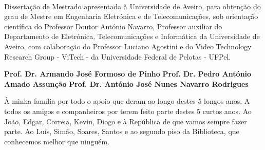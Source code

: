 \TitlePage

  \HEADER{\BAR}
         {\ThesisYear}
  \TITLE{\myName}
        {\TituloTese}
        {\ThesisTitle}
\EndTitlePage
\titlepage\ \endtitlepage %


%
%

\TitlePage
  \HEADER{}{\ThesisYear}
  \TITLE{\myName}
        {\TituloTese}
        {\ThesisTitle}
  \vskip 15mm
  \TEXT{}
       {Dissertação de Mestrado apresentada à Universidade de Aveiro, para obtenção do grau de Mestre em Engenharia Eletrónica e de Telecomunicações, sob orientação científica do Professor Doutor António Navarro, Professor auxiliar do Departamento de Eletrónica, Telecomunicações e Informática da  Universidade de Aveiro, com colaboração do Professor Luciano Agostini e do Video Technology Research Group - ViTech - da Universidade Federal de Pelotas - UFPel.}
\EndTitlePage
\titlepage\ \endtitlepage %

\TitlePage
  \vspace*{55mm}
       {}
       {\textbf{Prof. Dr. Armando José Formoso de Pinho
       }}
  \vspace*{5mm}
       {\textbf{Prof. Dr. Pedro António Amado Assunção}}
  \vspace*{5mm}
  \TEXT{}
       {\textbf{Prof. Dr. António José Nunes Navarro Rodrigues}}
\EndTitlePage
\titlepage\ \endtitlepage %

\TitlePage
  \vspace*{55mm}
       {À minha família por todo o apoio que deram ao longo destes 5 longos anos.}
  \TEXT{}
       {A todos os amigos e companheiros por terem feito parte destes 5 curtos anos.}
  \TEXT{}
       {Ao João, Edgar, Correia, Kevin, Diogo e à República de que vamos sempre fazer parte.}       
  \TEXT{}
       {Ao Luís, Simão, Soares, Santos e ao segundo piso da Biblioteca, que conhecemos melhor que ninguém.}
\EndTitlePage
\titlepage\ \endtitlepage %


